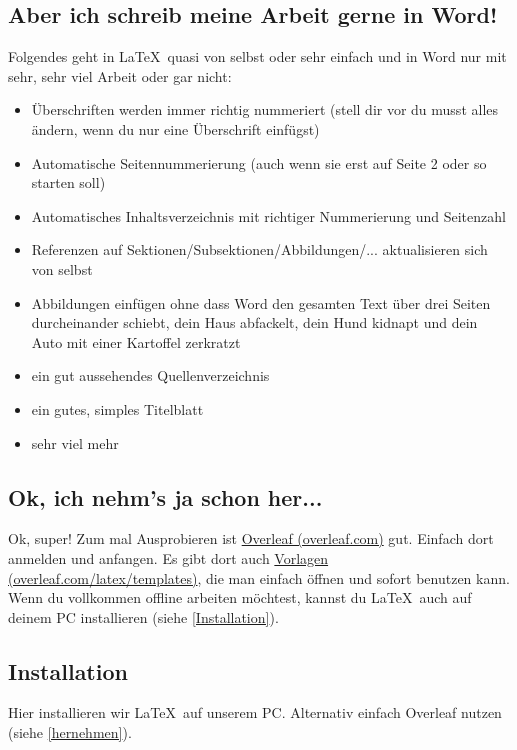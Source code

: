 \documentclass[titlepage]{article}
\begin{document}
\subsection{Aber ich schreib meine Arbeit gerne in Word!}

Folgendes geht in \LaTeX\ quasi von selbst oder sehr einfach und in Word nur mit sehr, sehr viel Arbeit oder gar nicht:
\begin{itemize}
	\item Überschriften werden immer richtig nummeriert (stell dir vor du musst alles ändern, wenn du nur eine Überschrift einfügst)
	\item Automatische Seitennummerierung (auch wenn sie erst auf Seite 2 oder so starten soll)
	\item Automatisches Inhaltsverzeichnis mit richtiger Nummerierung und Seitenzahl
	\item Referenzen auf Sektionen/Subsektionen/Abbildungen/... aktualisieren sich von selbst
	\item Abbildungen einfügen ohne dass Word den gesamten Text über drei Seiten durcheinander schiebt, dein Haus abfackelt, dein Hund kidnapt und dein Auto mit einer Kartoffel zerkratzt
	\item ein gut aussehendes Quellenverzeichnis
	\item ein gutes, simples Titelblatt
	\item sehr viel mehr
\end{itemize}

\subsection{Ok, ich nehm's ja schon her...} \label{hernehmen}

Ok, super!
Zum mal Ausprobieren ist \href{https://www.overleaf.com/}{Overleaf (overleaf.com)} gut.
Einfach dort anmelden und anfangen.
Es gibt dort auch \href{https://www.overleaf.com/latex/templates}{Vorlagen (overleaf.com/latex/templates)}, die man einfach öffnen und sofort benutzen kann. \\


Wenn du vollkommen offline arbeiten möchtest, kannst du \LaTeX\ auch auf deinem PC installieren (siehe \autoref{Installation}).

\subsection{Installation} \label{Installation}

Hier installieren wir \LaTeX\ auf unserem PC.
Alternativ einfach Overleaf nutzen (siehe \autoref{hernehmen}).
\end{document}
